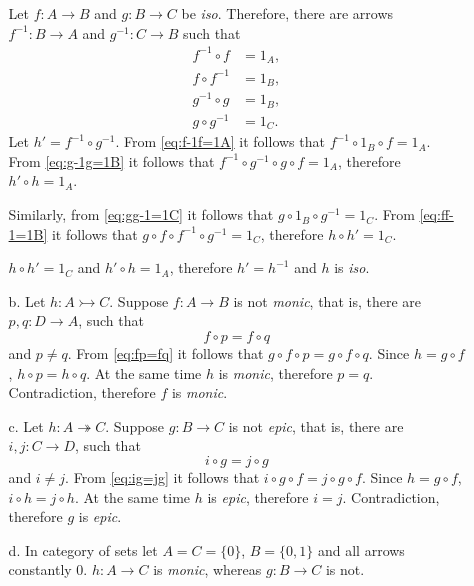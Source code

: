 \documentclass[12pt]{article}
\begin{document}
\begin{enumerate}
\begin{enumerate}

        Let $f : A \to B$ and $g : B \to C$ be \emph{iso}. Therefore, there are arrows $f^{-1} : B \to A$ and $g^{-1} : C \to B$ such that
        \begin{align}
          \label{eq:f-1f=1A} f^{-1} \circ f &= 1_A, \\
          \label{eq:ff-1=1C} f \circ f^{-1} &= 1_B, \\
          \label{eq:g-1g=1B} g^{-1} \circ g &= 1_B, \\
          \label{eq:gg-1=1C} g \circ g^{-1} &= 1_C. 
        \end{align}
        Let $h' = f^{-1} \circ g^{-1}$. From \ref{eq:f-1f=1A} it follows that $f^{-1} \circ 1_B \circ f = 1_A$. From \ref{eq:g-1g=1B} it follows that $f^{-1} \circ g^{-1} \circ g \circ f = 1_A$, therefore $h' \circ h = 1_A$.
        
        Similarly, from \ref{eq:gg-1=1C} it follows that $g \circ 1_B \circ g^{-1} = 1_C$. From \ref{eq:ff-1=1B} it follows that $g \circ f \circ f^{-1} \circ g^{-1} = 1_C$, therefore $h \circ h' = 1_C$.

        $h \circ h' = 1_C$ and $h' \circ h = 1_A$, therefore $h' = h^{-1}$ and $h$ is \emph{iso}.
      \item[b.]
        Let $h : A \rightarrowtail C$. Suppose $f : A \to B$ is not \emph{monic}, that is, there are $p, q : D \to A$, such that
        \begin{equation}
          \label{eq:fp=fq}
          f \circ p = f \circ q
        \end{equation}
        and $p \neq q$. From \ref{eq:fp=fq} it follows that $g \circ f \circ p = g \circ f \circ q$. Since $h = g \circ f$, $h \circ p = h \circ q$. At the same time $h$ is \emph{monic}, therefore $p = q$. Contradiction, therefore $f$ is \emph{monic}.
      \item[c.]  
        Let $h : A \twoheadrightarrow C$. Suppose $g : B \to C$ is not \emph{epic}, that is, there are $i, j : C \to D$, such that
        \begin{equation}
          \label{eq:ig=jg}
          i \circ g = j \circ g
        \end{equation}
        and $i \neq j$. From \ref{eq:ig=jg} it follows that $i \circ g \circ f = j \circ g \circ f$. Since $h = g \circ f$, $i \circ h = j \circ h$. At the same time $h$ is \emph{epic}, therefore $i = j$. Contradiction, therefore $g$ is \emph{epic}.
      \item[d.]
        In category of sets let $A = C = \{0\}$, $B = \{0, 1\}$ and all arrows constantly $0$. $h : A \to C$ is \emph{monic}, whereas $g : B \to C$ is not.
    \end{enumerate}


\end{enumerate}
\end{document}
